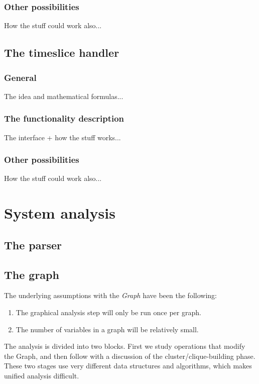 \documentclass[12pt,a4paper]{report}
\newcommand{\cdatatype}[1]{{\it #1}}
\begin{document}
\subsection{Other possibilities}

How the stuff could work also...


\newpage
\section{The timeslice handler} %
\subsection{General}

The idea and mathematical formulas...

\subsection{The functionality description}

The interface + how the stuff works...

\subsection{Other possibilities}

How the stuff could work also...



\newpage
\chapter{System analysis}
\section{The parser}

\section{The graph}
The underlying assumptions with the \cdatatype{Graph} have been the following:
\begin{enumerate}
\item The graphical analysis step will only be run once per graph.
\item The number of variables in a graph will be relatively small.
\end{enumerate}

The analysis is divided into two blocks. First we study operations that modify the Graph, and then follow with a discussion of the cluster/clique-building phase. These two stages use very different data structures and algorithms, which makes unified analysis difficult.
\end{document}
